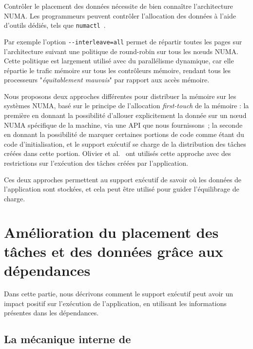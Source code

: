 \documentclass[parallelisme]{compas2016}
\begin{document}
Contrôler le placement des données nécessite de bien connaître l'architecture NUMA.
Les programmeurs peuvent contrôler l'allocation des données à l'aide d'outils
dédiés, tels que \verb/numactl/~\cite{DBLP:journals/corr/abs-1101-0093}.

Par exemple l'option \verb/--interleave=all/ permet de répartir toutes les pages
sur l'architecture suivant une politique de round-robin sur tous les nœuds NUMA.
Cette politique est largement utilisé avec du parallélisme dynamique,
car elle répartie le trafic mémoire sur tous les contrôleurs mémoire, rendant
tous les processeurs "\emph{équitablement mauvais}" par rapport aux accès mémoire.

Nous proposons deux approches différentes pour distribuer la mémoire sur les systèmes
NUMA, basé sur le principe de l'allocation \emph{first-touch} de la mémoire : la première
en donnant la possibilité d'allouer explicitement la donnée sur un nœud NUMA
spécifique de la machine, via une API que nous fournissons~\cite{Durand2013,BroFurGogWacNam10IJPP};
la seconde en donnant la possibilité de marquer certaines portions de code comme
étant du code d'initialisation, et le support exécutif se charge de la distribution
des tâches créées dans cette portion.
Olivier et al.~\cite{Olivier:2012:CMW:2388996.2389085} ont utilisés cette
approche avec des restrictions sur l'exécution des tâches créées par l'application.

Ces deux approches permettent au support exécutif de savoir où les données
de l'application sont stockées, et cela peut être utilisé pour guider l'équilibrage de charge.



\vspace*{-1ex}
\section{Amélioration du placement des tâches et des données grâce aux dépendances}
\label{sec:contributions}

Dans cette partie, nous décrivons comment le support exécutif peut avoir un impact
positif sur l'exécution de l'application, en utilisant les informations présentes
dans les dépendances.


\vspace*{-1ex}
\subsection{La mécanique interne de \kaapi}
\end{document}
